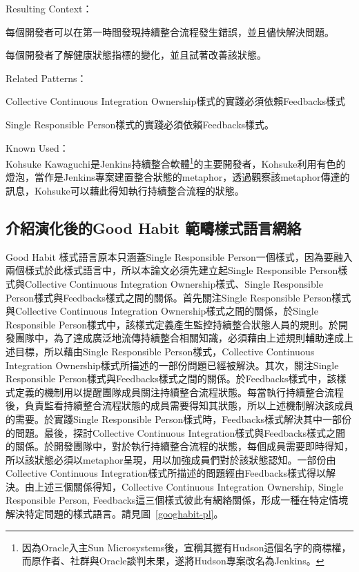 \begin{description}
\item Resulting Context：
\begin{description}
\item 每個開發者可以在第一時間發現持續整合流程發生錯誤，並且儘快解決問題。 
\item 每個開發者了解健康狀態指標的變化，並且試著改善該狀態。
\end{description} 
\item Related Patterns：
\begin{description}
\item Collective Continuous Integration Ownership樣式的實踐必須依賴Feedbacks樣式\item Single Responsible Person樣式的實踐必須依賴Feedbacks樣式。
\end{description}
\item Known Used：\\
Kohsuke Kawaguchi是Jenkins持續整合軟體\footnote{因為Oracle入主Sun Microsystems後，宣稱其握有Hudson這個名字的商標權，而原作者、社群與Oracle談判未果，遂將Hudson專案改名為Jenkins\cite{jenkinsci}。}的主要開發者，Kohsuke利用有色的燈泡，當作是Jenkins專案建置整合狀態的metaphor\cite{orb}，透過觀察該metaphor傳達的訊息，Kohsuke可以藉此得知執行持續整合流程的狀態。
\end{description}

\subsection{介紹演化後的Good Habit 範疇樣式語言網絡}
Good Habit 樣式語言原本只涵蓋Single Responsible Person一個樣式，因為要融入兩個樣式於此樣式語言中，所以本論文必須先建立起Single Responsible Person樣式與Collective Continuous Integration Ownership樣式、Single Responsible Person樣式與Feedbacks樣式之間的關係。首先關注Single Responsible Person樣式與Collective Continuous Integration Ownership樣式之間的關係，於Single Responsible Person樣式中，該樣式定義產生監控持續整合狀態人員的規則。於開發團隊中，為了達成廣泛地流傳持續整合相關知識，必須藉由上述規則輔助達成上述目標，所以藉由Single Responsible Person樣式，Collective Continuous Integration Ownership樣式所描述的一部份問題已經被解決。其次，關注Single Responsible Person樣式與Feedbacks樣式之間的關係。於Feedbacks樣式中，該樣式定義的機制用以提醒團隊成員關注持續整合流程狀態。每當執行持續整合流程後，負責監看持續整合流程狀態的成員需要得知其狀態，所以上述機制解決該成員的需要。於實踐Single Responsible Person樣式時，Feedbacks樣式解決其中一部份的問題。最後，探討Collective Continuous Integration樣式與Feedbacks樣式之間的關係。於開發團隊中，對於執行持續整合流程的狀態，每個成員需要即時得知，所以該狀態必須以metaphor呈現，用以加強成員們對於該狀態認知。一部份由Collective Continuous Integration樣式所描述的問題經由Feedbacks樣式得以解決。由上述三個關係得知，Collective Continuous Integration Ownership, Single Responsible Person, Feedbacks這三個樣式彼此有網絡關係，形成一種在特定情境解決特定問題的樣式語言。請見圖~\ref{googhabit-pl}。